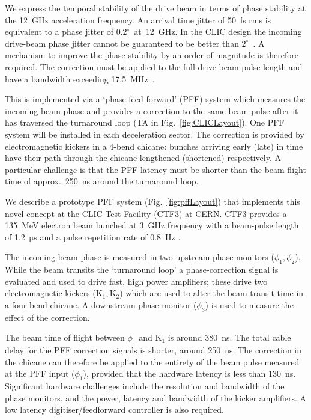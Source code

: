 \documentclass[%
 reprint,
 superscriptaddress,
 amsmath,
 amssymb,
 prl,
]{revtex4-1}
\begin{document}
We express the temporal stability of the drive beam in terms of phase 
stability at the 12~GHz acceleration frequency. An arrival time jitter of 50~fs 
rms is equivalent to a phase jitter of \(0.2^\circ\)~at~12~GHz.
In the CLIC design the incoming drive-beam phase jitter 
cannot be guaranteed to be better than \(2^\circ\)~\cite{CLICCDR}. A mechanism 
to improve the phase stability by an order of magnitude is 
therefore required. The correction must be applied to the full drive beam pulse 
length and have a bandwidth exceeding 17.5~MHz~\cite{Gerber2015}. 

This is implemented via a `phase feed-forward' (PFF) system which measures the 
incoming beam phase and provides a correction to the same beam pulse 
after it has traversed the turnaround loop (TA in Fig.~\ref{fig:CLICLayout}). 
One PFF system will be installed in each deceleration sector. The correction 
is provided by electromagnetic kickers in a 4-bend chicane: bunches arriving 
early (late) in time have their path through the chicane lengthened (shortened) 
respectively. A particular challenge is that the PFF latency must be shorter 
than the beam flight time of approx.~250~ns around the turnaround loop.

We describe a prototype PFF system (Fig.~\ref{fig:pffLayout}) that implements 
this novel concept at the CLIC Test Facility (CTF3) at CERN. CTF3 provides a 
135~MeV electron beam bunched at 3~GHz frequency with a beam-pulse length of 
1.2~\(\mathrm{\mu s}\) and a pulse repetition rate of 0.8~Hz \cite{CLICCDR}. 

The incoming beam phase is measured in two upstream phase 
monitors (\(\phi_{1}, \phi_{2}\)). While the beam 
transits the ‘turnaround loop’ a phase-correction signal is evaluated and used 
to drive fast, high power amplifiers; these drive two electromagnetic kickers 
(\(\mathrm{K_1, K_2}\)) which are used to alter the beam transit time in a 
four-bend chicane. A downstream phase monitor (\(\phi_{3}\)) is 
used to measure the effect of the correction. 

The beam time of flight between \(\phi_1\) and \(\mathrm{K_1}\) is around 
380~ns. The total cable delay for the PFF correction signals 
is shorter, around 250~ns. The correction in the chicane can therefore be 
applied to the entirety of the beam pulse measured at the PFF input 
(\(\phi_1\)), provided that the hardware latency is less than 130~ns. 
Significant hardware challenges include the resolution and bandwidth of the 
phase monitors, and the power, latency and bandwidth of the kicker amplifiers. 
A low latency digitiser/feedforward controller is also required.
 
\end{document}

